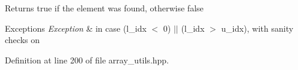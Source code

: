\begin{DoxyReturn}{Returns}
true if the element was found, otherwise false 
\end{DoxyReturn}

\begin{DoxyExceptions}{Exceptions}
{\em Exception} & in case (l\+\_\+idx $<$ 0) $\vert$$\vert$ (l\+\_\+idx $>$ u\+\_\+idx), with sanity checks on \\
\hline
\end{DoxyExceptions}


Definition at line 200 of file array\+\_\+utils.\+hpp.

\hypertarget{namespaceuva_1_1utils_1_1containers_1_1utils_af7ec60c27e50affde107ae926741b6d0}{}
